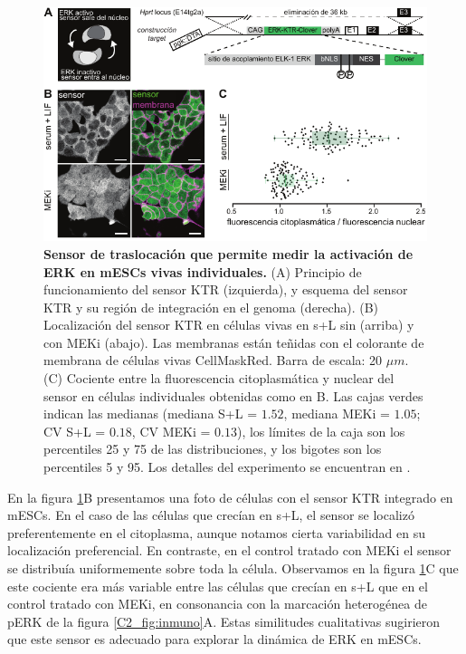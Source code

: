\documentclass[./main.tex]{subfiles}
\begin{document}
\begin{figure}
    \centering
    \includegraphics[width=1\columnwidth]{figures/chapter2/C2_KTR.pdf} 
    \caption{\textbf{Sensor de traslocación que permite medir la activación de ERK en mESCs vivas individuales.} (A) Principio de funcionamiento del sensor KTR (izquierda), y esquema del sensor KTR y su región de integración en el genoma (derecha). (B) Localización del sensor KTR en células vivas en s+L sin (arriba) y con MEKi (abajo). Las membranas están teñidas con el colorante de membrana de células vivas CellMaskRed. Barra de escala: 20 $\mu m$. (C) Cociente entre la fluorescencia citoplasmática y nuclear del sensor en células individuales obtenidas como en B. Las cajas verdes indican las medianas (mediana S+L = $1.52$, mediana MEKi = $1.05$; CV S+L = $0.18$, CV MEKi = $0.13$), los límites de la caja son los percentiles 25 y 75 de las distribuciones, y los bigotes son los percentiles 5 y 95. Los detalles del experimento se encuentran en \cite{Fabris2022}.}
    \label{C2_fig:KTR}
\end{figure}


En la figura \ref{C2_fig:KTR}B presentamos una foto de células con el sensor KTR integrado en mESCs. En el caso de las células que crecían en s+L, el sensor se localizó preferentemente en el citoplasma, aunque notamos cierta variabilidad en su localización preferencial. En contraste, en el control tratado con MEKi el sensor se distribuía uniformemente sobre toda la célula. Observamos en la figura \ref{C2_fig:KTR}C que este cociente era más variable entre las células que crecían en s+L que en el control tratado con MEKi, en consonancia con la marcación heterogénea de pERK de la figura \ref{C2_fig:inmuno}A. Estas similitudes cualitativas sugirieron que este sensor es adecuado para explorar la dinámica de ERK en mESCs.
\end{document}
